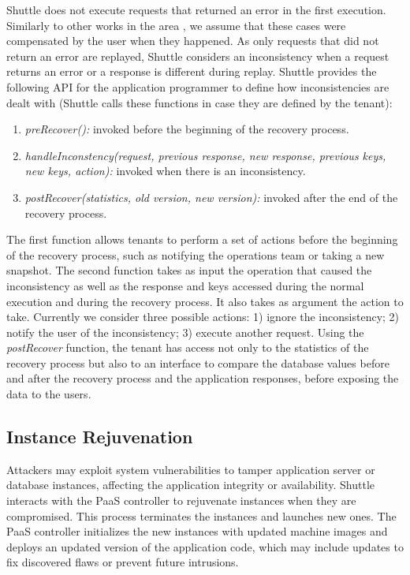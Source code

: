 \documentclass[10pt,conference]{IEEEtran}
\begin{document}
Shuttle does not execute requests that returned an error in the first execution. Similarly to other works in the area \cite{undoForOperators}, we assume that these cases were compensated by the user when they happened. As only requests that did not return an error are replayed, Shuttle considers an inconsistency when a request returns an error or a response is different during replay. Shuttle provides the following API for the application programmer to define how inconsistencies are dealt with (Shuttle calls these functions in case they are defined by the tenant):

\begin{enumerate}
  \item \textit{preRecover():} invoked before the beginning of the recovery process.
  \item \textit{handleInconstency(request, previous response, new response, previous keys, new keys, action):} invoked when there is an inconsistency.
  \item \textit{postRecover(statistics, old version, new version):} invoked after the end of the recovery process.
\end{enumerate}

The first function allows tenants to perform a set of actions before the beginning of the recovery process, such as notifying the operations team or taking a new snapshot. 
The second function takes as input the operation that caused the inconsistency as well as the response and keys accessed during the normal execution and during the recovery process. It also takes as argument the action to take. Currently we consider three possible actions: 1) ignore the inconsistency; 2) notify the user of the inconsistency; 3) execute another request. 
Using the \textit{postRecover} function, the tenant has access not only to the statistics of the recovery process but also to an interface to compare the database values before and after the recovery process and the application responses, before exposing the data to the users. 




\subsection{Instance Rejuvenation}
\label{sec:recovery:instance_rejuventaion}
Attackers may exploit system vulnerabilities to tamper application server or database instances, affecting the application integrity or availability. Shuttle interacts with the \ac{PaaS} controller to rejuvenate instances when they are compromised. This process terminates the instances and launches new ones. The PaaS controller initializes the new instances with updated machine images and deploys an updated version of the application code, which may include updates to fix discovered flaws or prevent future intrusions.
\end{document}
